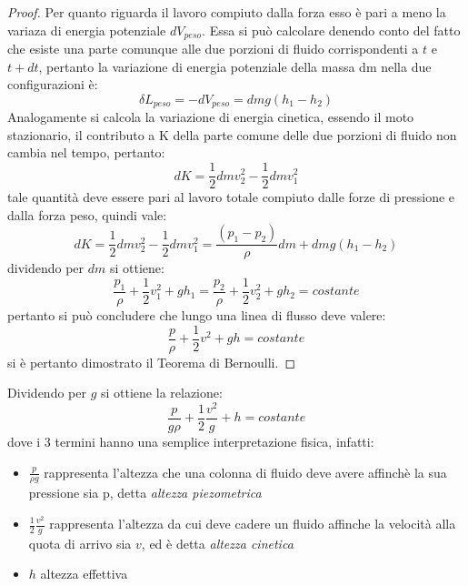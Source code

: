 \documentclass[11pt, a4paper, openright]{book}
\theoremstyle{plain}
\theoremstyle{definition}
\begin{document}
\begin{proof}
    Per quanto riguarda il lavoro compiuto dalla forza esso è pari a meno la variaza di energia potenziale $dV_{peso}$. Essa si può calcolare denendo conto del fatto che esiste una parte comunque alle due porzioni di fluido corrispondenti a $t$ e $t + dt$, pertanto la variazione di energia potenziale della massa dm nella due configurazioni è:
    \begin{equation}
        \delta L_{peso} = -dV_{peso} = dmg(h_1 - h_2)
    \end{equation}
    Analogamente si calcola la variazione di energia cinetica, essendo il moto stazionario, il contributo a K della parte comune delle due porzioni di fluido non cambia nel tempo, pertanto:
    \begin{equation}
        dK = \frac{1}{2}dmv_2^2 - \frac{1}{2}dmv_1^2
    \end{equation}
    tale quantità deve essere pari al lavoro totale compiuto dalle forze di pressione e dalla forza peso, quindi vale:
    \begin{equation}
        dK = \frac{1}{2}dmv_2^2 - \frac{1}{2}dmv_1^2 = \frac{(p_1 - p_2)}{\rho}dm + dmg(h_1 - h_2)
    \end{equation}
    dividendo per $dm$ si ottiene:
    \begin{equation}
        \frac{p_1}{\rho} + \frac{1}{2}v_1^2 + gh_1 = \frac{p_2}{\rho} + \frac{1}{2}v_2^2 + gh_2 = costante
    \end{equation}
    pertanto si può concludere che lungo una linea di flusso deve valere:
    \begin{equation}
        \frac{p}{\rho} + \frac{1}{2}v^2 + gh = costante
    \end{equation}
    si è pertanto dimostrato il Teorema di Bernoulli.
\end{proof}
Dividendo per $g$ si ottiene la relazione:
\begin{equation}
    \frac{p}{g\rho} + \frac{1}{2}\frac{v^2}{g} + h = costante
\end{equation}
dove i 3 termini hanno una semplice interpretazione fisica, infatti:
\begin{itemize}
    \item $\frac{p}{\rho g}$ rappresenta l'altezza che una colonna di fluido deve avere affinchè la sua pressione sia p, detta \textit{altezza piezometrica}
    \item $\frac{1}{2}\frac{v^2}{g}$ rappresenta l'altezza da cui deve cadere un fluido affinche la velocità alla quota di arrivo sia $v$, ed è detta \textit{altezza cinetica}
    \item $h$ altezza effettiva 
\end{itemize}
\end{document}
